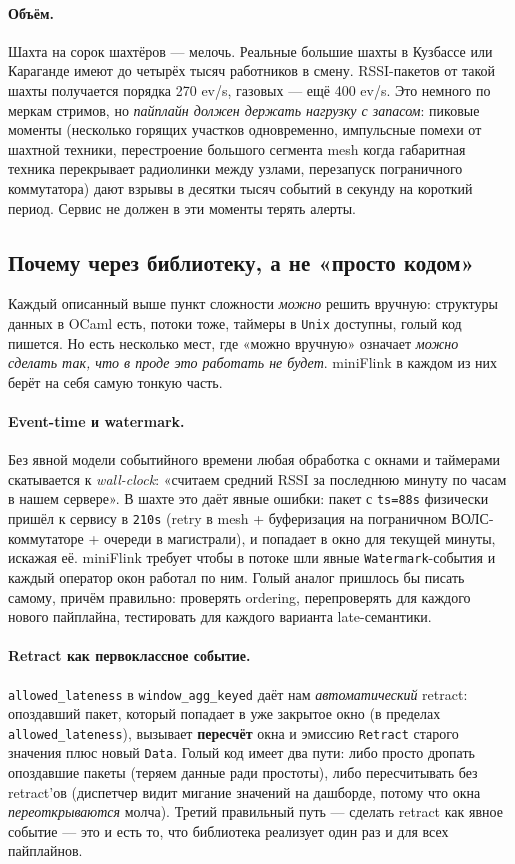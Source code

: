 \paragraph{Объём.} Шахта на сорок шахтёров --- мелочь. Реальные
большие шахты в Кузбассе или Караганде имеют до четырёх тысяч
работников в смену. RSSI-пакетов от такой шахты получается порядка
270 ev/s, газовых --- ещё 400 ev/s. Это
немного по меркам стримов, но \emph{пайплайн должен держать нагрузку
с запасом}: пиковые моменты (несколько горящих участков
одновременно, импульсные помехи от шахтной техники, перестроение
большого сегмента mesh когда габаритная техника перекрывает
радиолинки между узлами, перезапуск пограничного
коммутатора) дают взрывы в десятки тысяч событий
в секунду на короткий период. Сервис не должен в эти моменты
терять алерты.

\subsection{Почему через библиотеку, а не «просто кодом»}

Каждый описанный выше пункт сложности \emph{можно} решить вручную:
структуры данных в OCaml есть, потоки тоже, таймеры в \texttt{Unix}
доступны, голый код пишется. Но есть несколько мест, где «можно
вручную» означает \emph{можно сделать так, что в проде это работать
не будет}. miniFlink в каждом из них берёт на себя самую тонкую
часть.

\paragraph{Event-time и watermark.} Без явной модели событийного
времени любая обработка с окнами и таймерами скатывается к
\textit{wall-clock}: «считаем средний RSSI за последнюю минуту по
часам в нашем сервере». В шахте это даёт явные ошибки: пакет с
\texttt{ts=88s} физически пришёл к сервису в \texttt{210s} (retry
в mesh + буферизация на пограничном ВОЛС-коммутаторе + очереди в
магистрали), и попадает в окно для текущей минуты,
искажая её. miniFlink требует чтобы в потоке шли явные
\texttt{Watermark}-события и каждый оператор окон работал по ним.
Голый аналог пришлось бы писать самому, причём правильно: проверять
ordering, перепроверять для каждого нового пайплайна, тестировать
для каждого варианта late-семантики.

\paragraph{Retract как первоклассное событие.}
\texttt{allowed\_lateness} в \texttt{window\_agg\_keyed} даёт нам
\emph{автоматический} retract: опоздавший пакет, который попадает в
уже закрытое окно (в пределах \texttt{allowed\_lateness}), вызывает
\textbf{пересчёт} окна и эмиссию \texttt{Retract} старого значения
плюс новый \texttt{Data}. Голый код имеет два пути: либо просто
дропать опоздавшие пакеты (теряем данные ради простоты), либо
пересчитывать без retract'ов (диспетчер видит мигание значений на
дашборде, потому что окна \emph{переоткрываются} молча). Третий
правильный путь --- сделать retract как явное событие --- это и есть
то, что библиотека реализует один раз и для всех пайплайнов.


